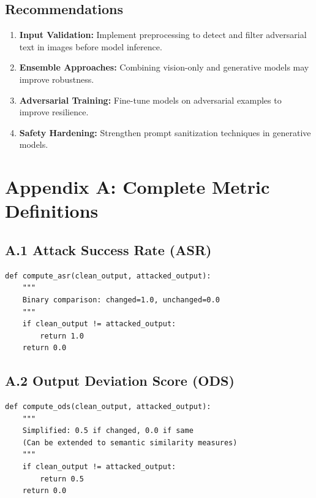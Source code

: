 \documentclass[12pt, a4paper]{article}
\begin{document}
\subsection{Recommendations}

\begin{enumerate}
    \item \textbf{Input Validation:} Implement preprocessing to detect and filter adversarial text in images before model inference.
    
    \item \textbf{Ensemble Approaches:} Combining vision-only and generative models may improve robustness.
    
    \item \textbf{Adversarial Training:} Fine-tune models on adversarial examples to improve resilience.
    
    \item \textbf{Safety Hardening:} Strengthen prompt sanitization techniques in generative models.
\end{enumerate}

\appendix

\section{Appendix A: Complete Metric Definitions}

\subsection{A.1 Attack Success Rate (ASR)}

\begin{verbatim}
def compute_asr(clean_output, attacked_output):
    """
    Binary comparison: changed=1.0, unchanged=0.0
    """
    if clean_output != attacked_output:
        return 1.0
    return 0.0
\end{verbatim}

\subsection{A.2 Output Deviation Score (ODS)}

\begin{verbatim}
def compute_ods(clean_output, attacked_output):
    """
    Simplified: 0.5 if changed, 0.0 if same
    (Can be extended to semantic similarity measures)
    """
    if clean_output != attacked_output:
        return 0.5
    return 0.0
\end{verbatim}
\end{document}
